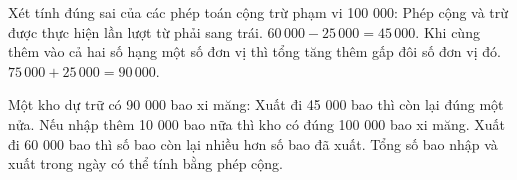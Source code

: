 \begin{ex} %
Xét tính đúng sai của các phép toán cộng trừ phạm vi 100 000:
\choiceTF
{\True Phép cộng và trừ được thực hiện lần lượt từ phải sang trái.}
{$60\,000 - 25\,000 = 45\,000$.}
{\True Khi cùng thêm vào cả hai số hạng một số đơn vị thì tổng tăng thêm gấp đôi số đơn vị đó.}
{$75\,000 + 25\,000 = 90\,000$.}
\end{ex}

\begin{ex} %
Một kho dự trữ có 90 000 bao xi măng:
\choiceTF
{\True Xuất đi 45 000 bao thì còn lại đúng một nửa.}
{\True Nếu nhập thêm 10 000 bao nữa thì kho có đúng 100 000 bao xi măng.}
{Xuất đi 60 000 bao thì số bao còn lại nhiều hơn số bao đã xuất.}
{\True Tổng số bao nhập và xuất trong ngày có thể tính bằng phép cộng.}
\end{ex}

